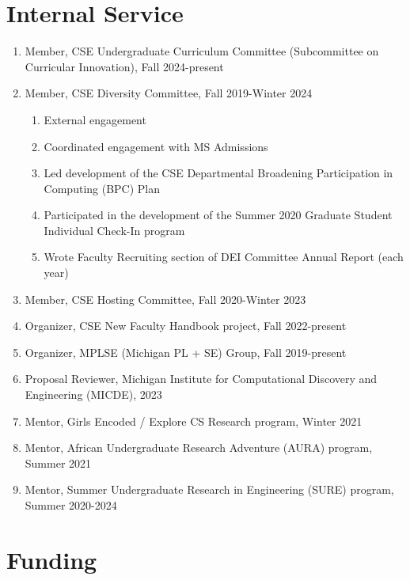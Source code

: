 \documentclass[10pt,letterpaper]{article}
\begin{document}
\section*{Internal Service}
\begin{enumerate}
  \item Member, CSE Undergraduate Curriculum Committee (Subcommittee on Curricular Innovation), Fall 2024-present
  \item Member, CSE Diversity Committee, Fall 2019-Winter 2024
        \begin{enumerate}
          \item External engagement
          \item Coordinated engagement with MS Admissions
          \item Led development of the CSE Departmental Broadening Participation in Computing (BPC) Plan
          \item Participated in the development of the Summer 2020 Graduate Student Individual Check-In program
          \item Wrote Faculty Recruiting section of DEI Committee Annual Report (each year)
        \end{enumerate}
  \item Member, CSE Hosting Committee, Fall 2020-Winter 2023
  \item Organizer, CSE New Faculty Handbook project, Fall 2022-present
  \item Organizer, MPLSE (Michigan PL + SE) Group, Fall 2019-present
  \item Proposal Reviewer, Michigan Institute for Computational Discovery and Engineering (MICDE), 2023
  \item Mentor, Girls Encoded / Explore CS Research program, Winter 2021
  \item Mentor, African Undergraduate Research Adventure (AURA) program, Summer 2021
  \item Mentor, Summer Undergraduate Research in Engineering (SURE) program, Summer 2020-2024
\end{enumerate}


\section*{Funding}
\end{document}
